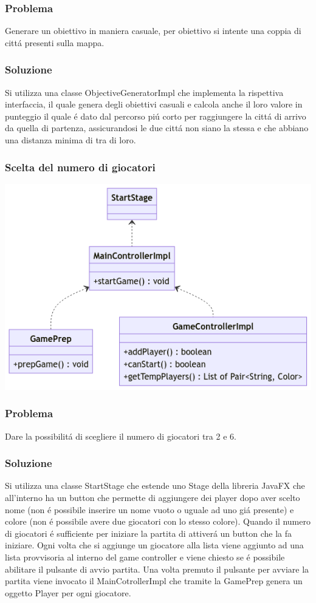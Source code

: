 \documentclass[a4paper,12pt]{report}
\begin{document}
%

\subsubsection{Problema}
Generare un obiettivo in maniera casuale, per obiettivo si intente una coppia di cittá presenti sulla mappa.
%
\subsubsection{Soluzione}
Si utilizza una classe ObjectiveGeneratorImpl che implementa la rispettiva interfaccia, il quale genera degli obiettivi casuali e calcola anche il loro valore in punteggio il quale é dato dal percorso piú corto per raggiungere la cittá di arrivo da quella di partenza, assicurandosi le due cittá non siano la stessa e che abbiano una distanza minima di tra di loro.
\newpage
\subsubsection{Scelta del numero di giocatori}
\begin{center}
\includegraphics[scale=0.7]{numerodigiocatoriUML (1).png}
\end{center}

%
\subsubsection{Problema}
Dare la possibilitá di scegliere il numero di giocatori tra 2 e 6.
%
\subsubsection{Soluzione}
Si utilizza una classe StartStage che estende uno Stage della libreria JavaFX che all'interno ha un button che permette di aggiungere dei player dopo aver scelto nome (non é possibile inserire un nome vuoto o uguale ad uno giá presente) e colore (non é possibile avere due giocatori con lo stesso colore). Quando il numero di giocatori é sufficiente per iniziare la partita di attiverá un button che la fa iniziare. Ogni volta che si aggiunge un giocatore alla lista viene aggiunto ad una lista provvisoria al interno del game controller e viene chiesto se é possibile abilitare il pulsante di avvio partita. Una volta premuto il pulsante per avviare la partita viene invocato il MainCotrollerImpl che tramite la GamePrep genera un oggetto Player per ogni giocatore.
\newpage
\end{document}
